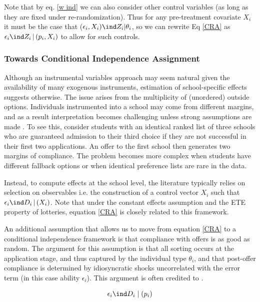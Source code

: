 \documentclass[a4paper, article, english, oneside, unknownkeysallowed, 12pt]{memoir}
\begin{document}
Note that by eq. \ref{w ind} we can also consider other control variables (as long as they are fixed under re-randomization). Thus for any pre-treatment covariate $X_i$ it must be the case that 
($\epsilon_i, X_i) \ind Z_i | \theta_i$, so we can rewrite Eq \ref{CRA} as $  \epsilon_i \ind Z_i \, | \, (p_i, X_i) $ to allow for such controls.

\subsubsection{Towards Conditional Independence Assignment}

Although an instrumental variables approach may seem natural given the availability of many exogenous instruments, estimation of school-specific effects suggests otherwise. The issue arises from the multiplicity of (unordered) outside options. 
Individuals instrumented into a school may come from different margins, and as a result interpretation becomes challenging unless strong assumptions are made \parencite{angrist_methods_2023} \parencite{kirkeboen_field_2016}.  
To see this, consider students with an identical ranked list of three schools who are guaranteed admission to their third choice if they are not successful in their first two applications. An offer to the first school then generates two margins of compliance.
The problem becomes more complex when students have different fallback options or when identical preference lists are rare in the data.

Instead, to compute effects at the school level, the literature typically relies on selection on observables i.e. the construction of a control vector $X_i$ such that $ \epsilon_i \ind D_i \, | \, (X_i)$.
Note that under the constant effects assumption and the ETE property of lotteries, equation \ref{CRA} is closely related to this framework. 

An additional assumption that allows us to move from equation \ref{CRA} to a conditional independence framework is that compliance with offers is as good as random.
The argument for this assumption is that all sorting occurs at the application stage, and thus captured by the individual type $\theta_i$, and that post-offer compliance is determined by idiosyncratic shocks uncorrelated with the error term (in this case ability $\epsilon_i$).
This argument is often credited to \textcite{dale_estimating_2002}. 

\begin{equation}
  \epsilon_i \ind D_i  \mid (p_i) 
  \label{CIA}
\end{equation}
\end{document}
